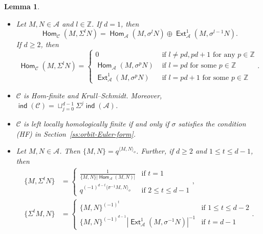 \documentclass[reqno,12pt,a4paper]{amsart}
\newtheorem{lemma}[theorem]{Lemma}
\theoremstyle{remark}
\theoremstyle{definition}
\newcommand{\opname}[1]{\operatorname{\mathsf{#1}}}
\newcommand{\ind}{\opname{ind}}
\newcommand{\Hom}{\opname{Hom}}
\newcommand{\Ext}{\opname{Ext}}
\newcommand{\ca}{{\mathcal A}}
\newcommand{\cc}{{\mathcal C}}
\numberwithin{equation}{section}
\begin{document}
\begin{lemma}
\label{lem:when-is-root-category-left-homologically-finite}
\begin{itemize}
\item[(a)] Let $M,N\in\ca$ and $l\in\mathbb{Z}$. If $d=1$, then
\[
\Hom_\cc(M,\Sigma^l N)=\Hom_\ca(M,\sigma^l N)\oplus \Ext^1_\ca(M,\sigma^{l-1}N).
\]
If $d\geq 2$, then
\[
\Hom_\cc(M,\Sigma^{l}N)=\begin{cases} 0 & \text{ if } l\neq pd, pd+1 \text{ for any }p\in\mathbb{Z}\\
\Hom_\ca(M,\sigma^{p}N) & \text{ if } l=pd \text{ for some }p\in\mathbb{Z}\\
\Ext^1_\ca(M,\sigma^{p}N) & \text{ if }l=pd+1 \text{ for some }p\in\mathbb{Z}
\end{cases}.
\]
\item[(b)] $\cc$ is Hom-finite and Krull--Schmidt. Moreover, $\ind(\cc)=\sqcup_{j=0}^{d-1}\Sigma^{j}\ind(\ca)$.
\item[(c)]
$\cc$ is left locally homologically finite if and only if
$\sigma$ satisfies the condition (HF) in Section~\ref{ss:orbit-Euler-form}.
\item[(d)] Let $M,N\in\ca$. Then $\{M,N\}=q^{\langle M,N\rangle_o}$. Further, if $d\geq 2$ and $1\leq t\leq d-1$, then
\begin{align*}
\{M,\Sigma^tN\}&=\begin{cases}\frac{1}{\{M,N\}|\Hom_\ca(M,N)|} & \text{if }t=1\\ q^{(-1)^{d-t}\langle\sigma^{-1}M,N\rangle_o} & \text{if }2\leq t\leq d-1\end{cases},\\
\{\Sigma^t M,N\}&=\begin{cases} \{M,N\}^{(-1)^t} & \text{if }1\leq t\leq d-2\\
\{M,N\}^{(-1)^{d-1}}|\Ext^1_\ca(M,\sigma^{-1}N)|^{-1} & \text{if }t=d-1\end{cases}.
\end{align*}
\end{itemize}
\end{lemma}
\end{document}
